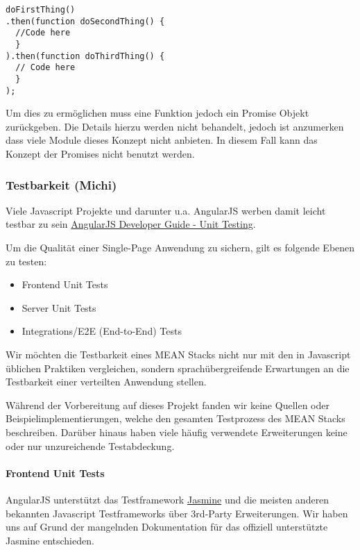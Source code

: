\documentclass[]{article}
\begin{document}
\begin{verbatim}
doFirstThing()
.then(function doSecondThing() {
  //Code here
  }
).then(function doThirdThing() {
  // Code here
  }
);
\end{verbatim}

Um dies zu ermöglichen muss eine Funktion jedoch ein Promise Objekt
zurückgeben. Die Details hierzu werden nicht behandelt, jedoch ist
anzumerken dass viele Module dieses Konzept nicht anbieten. In diesem
Fall kann das Konzept der Promises nicht benutzt werden.

\subsubsection{Testbarkeit (Michi)}\label{testbarkeit-michi}

Viele Javascript Projekte und darunter u.a. AngularJS werben damit
leicht testbar zu sein
\href{https://docs.angularjs.org/guide/unit-testing}{AngularJS Developer
Guide - Unit Testing}.

Um die Qualität einer Single-Page Anwendung zu sichern, gilt es folgende
Ebenen zu testen:

\begin{itemize}
\itemsep1pt\parskip0pt
\item
  Frontend Unit Tests
\item
  Server Unit Tests
\item
  Integrations/E2E (End-to-End) Tests
\end{itemize}

Wir möchten die Testbarkeit eines MEAN Stacks nicht nur mit den in
Javascript üblichen Praktiken vergleichen, sondern sprachübergreifende
Erwartungen an die Testbarkeit einer verteilten Anwendung stellen.

Während der Vorbereitung auf dieses Projekt fanden wir keine Quellen
oder Beispielimplementierungen, welche den gesamten Testprozess des MEAN
Stacks beschreiben. Darüber hinaus haben viele häufig verwendete
Erweiterungen keine oder nur unzureichende Testabdeckung.

\paragraph{Frontend Unit Tests}\label{frontend-unit-tests}

AngularJS unterstützt das Testframework
\href{http://jasmine.github.io/}{Jasmine} und die meisten anderen
bekannten Javascript Testframeworks über 3rd-Party Erweiterungen. Wir
haben uns auf Grund der mangelnden Dokumentation für das offiziell
unterstützte Jasmine entschieden.
\end{document}
